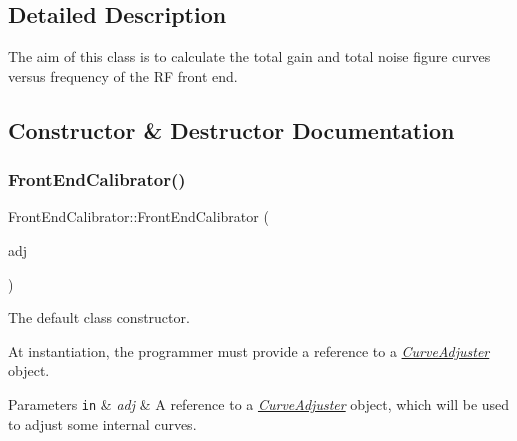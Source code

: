 \subsection{Detailed Description}
The aim of this class is to calculate the total gain and total noise figure curves versus frequency of the RF front end. 

\subsection{Constructor \& Destructor Documentation}
\mbox{\label{classFrontEndCalibrator_abff839c00a46ff060c1d66fc3b151d65}} 
\subsubsection{\texorpdfstring{Front\+End\+Calibrator()}{FrontEndCalibrator()}\hspace{0.1cm}{\footnotesize\ttfamily [1/2]}}
{\footnotesize\ttfamily Front\+End\+Calibrator\+::\+Front\+End\+Calibrator (\begin{DoxyParamCaption}\item[{\hyperlink{classCurveAdjuster}{Curve\+Adjuster} \&}]{adj }\end{DoxyParamCaption})}



The default class constructor. 

At instantiation, the programmer must provide a reference to a {\itshape \hyperlink{classCurveAdjuster}{Curve\+Adjuster}} object. 
\begin{DoxyParams}[1]{Parameters}
\mbox{\tt in}  & {\em adj} & A reference to a {\itshape \hyperlink{classCurveAdjuster}{Curve\+Adjuster}} object, which will be used to adjust some internal curves. \\
\hline
\end{DoxyParams}
\mbox{\label{classFrontEndCalibrator_a026150fceb18ec9601cbc698e04f39cc}} 
